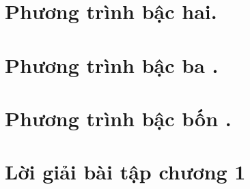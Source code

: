  \section{Phương trình bậc hai.}



\section{Phương trình bậc ba .}

\section{Phương trình bậc bốn .}
\section*{Lời giải bài tập chương 1}
{\small}
